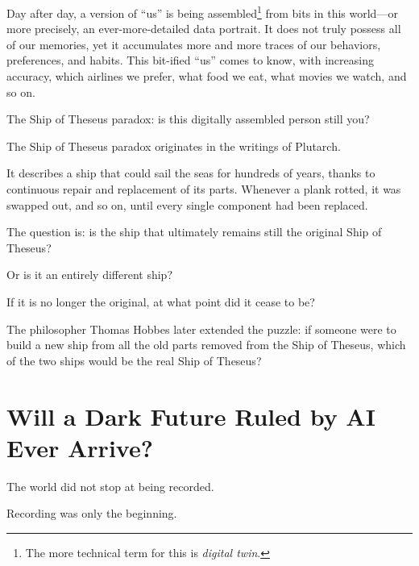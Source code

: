 \vspace{1em}

Day after day, a version of ``us'' is being assembled\footnote{The more technical term for this is \textit{digital twin}.} from bits in this world---or more precisely, an ever-more-detailed data portrait. It does not truly possess all of our memories, yet it accumulates more and more traces of our behaviors, preferences, and habits. This bit-ified ``us'' comes to know, with increasing accuracy, which airlines we prefer, what food we eat, what movies we watch, and so on.

\begin{thinkbox}[Reflection]
The Ship of Theseus paradox: is this digitally assembled person still you?
\end{thinkbox}

\newpage
\begin{myquote}
The Ship of Theseus paradox originates in the writings of Plutarch.

It describes a ship that could sail the seas for hundreds of years, thanks to continuous repair and replacement of its parts. Whenever a plank rotted, it was swapped out, and so on, until every single component had been replaced.

\vspace{1em}

The question is: is the ship that ultimately remains still the original Ship of Theseus?

Or is it an entirely different ship?

If it is no longer the original, at what point did it cease to be?

\vspace{1em}

The philosopher Thomas Hobbes later extended the puzzle: if someone were to build a new ship from all the old parts removed from the Ship of Theseus, which of the two ships would be the real Ship of Theseus?
\end{myquote}

\section{Will a Dark Future Ruled by AI Ever Arrive?}

The world did not stop at being recorded.

\vspace{1em}

Recording was only the beginning.

